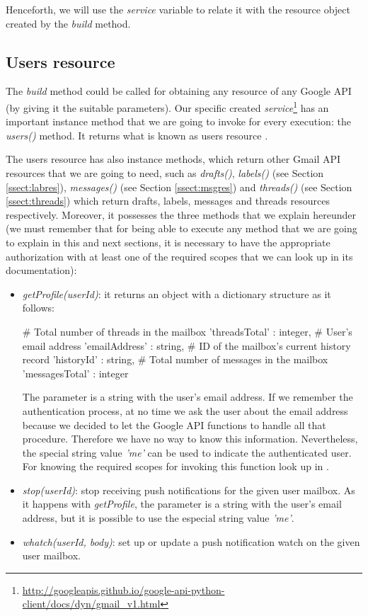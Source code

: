 Henceforth, we will use the \textit{service} variable to relate it with the resource object created by the \textit{build} method.

\subsection{Users resource}\label{ssect:userres}
The \textit{build} method could be called for obtaining any resource of any Google API (by giving it the suitable parameters). Our specific created \textit{service}\footnote{\url{http://googleapis.github.io/google-api-python-client/docs/dyn/gmail\_v1.html}} has an important instance method that we are going to invoke for every execution: the \textit{users()} method. It returns what is known as users resource \citep[/v1/reference/users]{gmailAPI}.

The users resource has also instance methods, which return other Gmail API resources that we are going to need, such as \textit{drafts()}, \textit{labels()} (see Section \ref{ssect:labres}), \textit{messages()} (see Section \ref{ssect:msgres}) and \textit{threads()} (see Section \ref{ssect:threads}) which return drafts, labels, messages and threads resources respectively. Moreover, it possesses the three methods that we explain hereunder (we must remember that for being able to execute any method that we are going to explain in this and next sections, it is necessary to have the appropriate authorization with at least one of the required scopes that we can look up in its documentation):

\begin{itemize}
	\item\textit{getProfile(userId)}: it returns an object with a dictionary structure as it follows:
	\begin{python}
		{
			# Total number of threads in the mailbox
			'threadsTotal' : integer,
			# User's email address
			'emailAddress' : string,
			# ID of the mailbox's current history record
			'historyId' : string,
			# Total number of messages in the mailbox
			'messagesTotal' : integer
		}
	\end{python}
	The parameter is a string with the user's email address. If we remember the authentication process, at no time we ask the user about the email address because we decided to let the Google API functions to handle all that procedure. Therefore we have no way to know this information. Nevertheless, the special string value \textit{'me'} can be used to indicate the authenticated user. For knowing the required scopes for invoking this function look up in \cite[/v1/reference/users/getProfile]{gmailAPI}.
	\item\textit{stop(userId)}: stop receiving push notifications for the given user mailbox. As it happens with \textit{getProfile}, the parameter is a string with the user's email address, but it is possible to use the especial string value \textit{'me'}.
	\item\textit{whatch(userId, body)}: set up or update a push notification watch on the given user mailbox.
\end{itemize}

